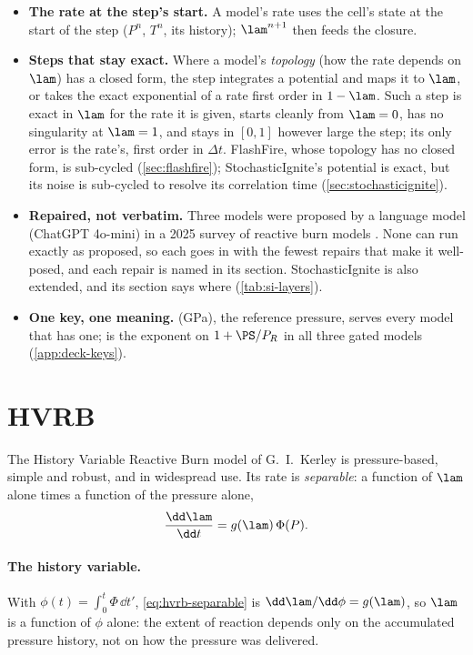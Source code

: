\begin{itemize}
\item \textbf{The rate at the step's start.} A model's rate uses the cell's
  state at the start of the step ($P^n$, $T^n$, its history); $\lam^{n+1}$
  then feeds the closure.
\item \textbf{Steps that stay exact.} Where a model's \emph{topology} (how
  the rate depends on $\lam$) has a closed form, the step integrates a
  potential and maps it to $\lam$, or takes the exact exponential of a rate
  first order in $1 - \lam$. Such a step is exact in $\lam$ for the rate it
  is given, starts cleanly from $\lam = 0$, has no singularity at $\lam = 1$,
  and stays in $[0, 1]$ however large the step; its only error is the
  rate's, first order in $\Delta t$. FlashFire, whose topology has no
  closed form, is sub-cycled (\cref{sec:flashfire}); StochasticIgnite's
  potential is exact, but its noise is sub-cycled to resolve its correlation
  time (\cref{sec:stochasticignite}).
\item \textbf{Repaired, not verbatim.} Three models were proposed by a
  language model (ChatGPT 4o-mini) in a 2025 survey of reactive burn models
  \cite{kittell2025sand}. None can run exactly as proposed, so each goes in
  with the fewest repairs that make it well-posed, and each repair is named
  in its section. StochasticIgnite is also extended, and its section says
  where (\cref{tab:si-layers}).
\item \textbf{One key, one meaning.}  (GPa), the reference
  pressure, serves every model that has one;  is the exponent on
  $1 + \PS/P_R$ in all three gated models (\cref{app:deck-keys}).
\end{itemize}

\section{HVRB}
\label{sec:hvrb}

The History Variable Reactive Burn model of G.~I.~Kerley
\cite{starkenberg2002,starkenberg2010,stewart2024} is pressure-based,
simple and robust, and in widespread use. Its rate is \emph{separable}: a
function of $\lam$ alone times a function of the pressure alone,
\begin{equation}
  \frac{\dd\lam}{\dd t} = g(\lam)\,\Phi(P).
  \label{eq:hvrb-separable}
\end{equation}

\paragraph{The history variable.} With $\phi(t) = \int_0^t \Phi\,\dd t'$,
\cref{eq:hvrb-separable} is $\dd\lam/\dd\phi = g(\lam)$, so $\lam$ is a
function of $\phi$ alone: the extent of reaction depends only on the
accumulated pressure history, not on how the pressure was delivered.

